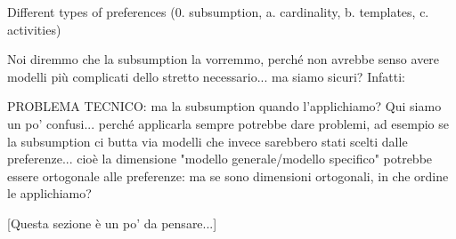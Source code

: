 
Different types of preferences
(0. subsumption, a. cardinality, b. templates, c. activities)

Noi diremmo che la subsumption la vorremmo, perché non avrebbe senso avere modelli più complicati dello stretto necessario... ma siamo sicuri? Infatti:

PROBLEMA TECNICO: ma la subsumption quando l'applichiamo? Qui siamo un po' confusi... perché applicarla sempre potrebbe dare problemi, ad esempio se la subsumption ci butta via modelli che invece sarebbero stati scelti dalle preferenze... cioè la dimensione "modello generale/modello specifico" potrebbe essere ortogonale alle preferenze: ma se sono dimensioni ortogonali, in che ordine le applichiamo?

[Questa sezione è un po' da pensare...]
